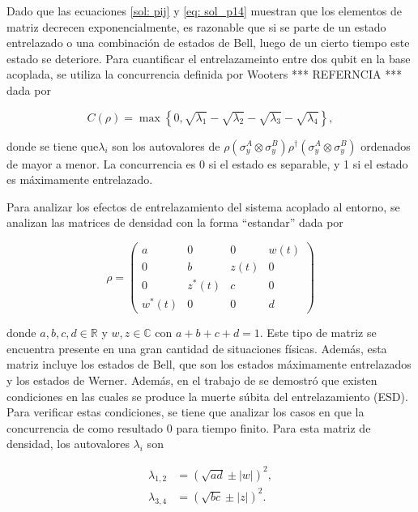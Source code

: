 Dado que las ecuaciones \ref{sol: pij} y \ref{eq: sol_p14} muestran que los elementos de matriz decrecen exponencialmente, es razonable que si se parte de un estado entrelazado o una combinación de estados de Bell, luego de un cierto tiempo este estado se deteriore. Para cuantificar el entrelazameinto entre dos qubit en la base acoplada, se utiliza la concurrencia definida por Wooters *** REFERNCIA *** dada por

\begin{equation}
    C(\rho) = \max \left\{0,\sqrt{\lambda_1}-\sqrt{\lambda_2}-\sqrt{\lambda_3}-\sqrt{\lambda_4}\right\},
\end{equation}


\noindent donde se tiene que\(\lambda_i\) son los autovalores de \(\rho(\sigma_y^A \otimes \sigma_y^B) \rho^\dagger (\sigma_y^A \otimes \sigma_y^B)\) ordenados de mayor a menor. La concurrencia es 0 si el estado es separable, y 1 si el estado es máximamente entrelazado.

Para analizar los efectos de entrelazamiento del sistema acoplado al entorno, se analizan las matrices de densidad con la forma ``estandar'' dada por

\begin{equation} \label{eq: rho_standar}
    \rho = \begin{pmatrix}
        a & 0 & 0 & w(t) \\
        0 & b & z(t) & 0 \\
        0 & z^*(t) & c & 0 \\
        w^*(t) & 0 & 0 & d
    \end{pmatrix}
\end{equation}

\noindent donde \(a,b,c,d \in \mathbb{R}\) y \(w,z \in \mathbb{C}\) con \(a+b+c+d = 1\). Este tipo de matriz se encuentra presente en una gran cantidad de situaciones físicas. Además, esta matriz incluye los estados de Bell, que son los estados máximamente entrelazados y los estados de Werner. Además, en el trabajo de \cite{ESB} se demostró que existen condiciones en las cuales se produce la muerte súbita del entrelazamiento (ESD). Para verificar estas condiciones, se tiene que analizar los casos en que la concurrencia de como resultado 0 para tiempo finito. Para esta matriz de densidad, los autovalores \(\lambda_i\) son

\begin{align}
    \lambda_{1, 2} &= \left(\sqrt{ad} \pm |w|\right)^2, \label{eq: eigval_12} \\
    \lambda_{3, 4} &= \left(\sqrt{bc} \pm |z|\right)^2 \label{eq: eigval_34}.
\end{align}

